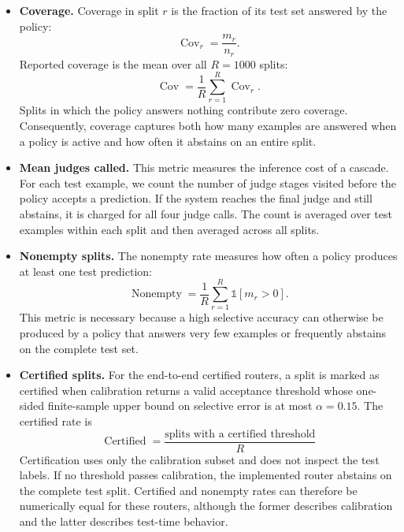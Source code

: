 \documentclass[11pt]{article}
\begin{document}
\begin{itemize}
    \item \textbf{Coverage.}
    Coverage in split $r$ is the fraction of its test set answered by the
    policy:
    \[
        \operatorname{Cov}_r = \frac{m_r}{n_r}.
    \]
    Reported coverage is the mean over all $R=1000$ splits:
    \[
        \operatorname{Cov} =
        \frac{1}{R}\sum_{r=1}^{R}\operatorname{Cov}_r.
    \]
    Splits in which the policy answers nothing contribute zero coverage.
    Consequently, coverage captures both how many examples are answered when a
    policy is active and how often it abstains on an entire split.

    \item \textbf{Mean judges called.}
    This metric measures the inference cost of a cascade. For each test
    example, we count the number of judge stages visited before the policy
    accepts a prediction. If the system reaches the final judge and still
    abstains, it is charged for all four judge calls. The count is averaged
    over test examples within each split and then averaged across all splits.

    \item \textbf{Nonempty splits.}
    The nonempty rate measures how often a policy produces at least one test
    prediction:
    \[
        \operatorname{Nonempty} =
        \frac{1}{R}\sum_{r=1}^{R}\mathbb{1}[m_r>0].
    \]
    This metric is necessary because a high selective accuracy can otherwise
    be produced by a policy that answers very few examples or frequently
    abstains on the complete test set.

    \item \textbf{Certified splits.}
    For the end-to-end certified routers, a split is marked as certified when
    calibration returns a valid acceptance threshold whose one-sided
    finite-sample upper bound on selective error is at most
    $\alpha=0.15$. The certified rate is
    \[
        \operatorname{Certified} =
        \frac{\text{splits with a certified threshold}}{R}
    \]
    Certification uses only the calibration subset and does not inspect the
    test labels. If no threshold passes calibration, the implemented router
    abstains on the complete test split. Certified and nonempty rates can
    therefore be numerically equal for these routers, although the former
    describes calibration and the latter describes test-time behavior.


\end{itemize}
\end{document}
